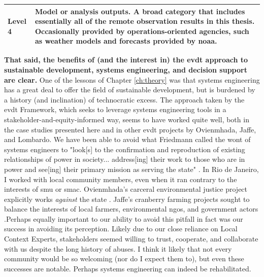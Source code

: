 \begin{table}[!htb]
\begin{center}
\begin{tabular}{ C{3cm}   L{8cm} }
Level 4 & Model or analysis outputs. A broad category that includes essentially all of the remote observation results in this thesis. Occasionally provided by operations-oriented agencies, such as weather models and forecasts provided by \ac{noaa}. \\ \hline

\end{tabular}
\end{center}
\end{table}

\textbf{That said, the benefits of (and the interest in) the \ac{evdt} approach to sustainable development, systems engineering, and decision support are clear.} One of the lessons of Chapter \ref{ch:theory} was that systems engineering has a great deal to offer the field of sustainable development, but is burdened by a history (and inclination) of technocratic excess. The approach taken by the \ac{evdt} Framework, which seeks to leverage systems engineering tools in a stakeholder-and-equity-informed way, seems to have worked quite well, both in the case studies presented here and in other \ac{evdt} projects by Ovienmhada, Jaffe, and Lombardo. We have been able to avoid what Friedmann called the wont of systems engineers to "look[s] to the confirmation and reproduction of existing relationships of power in society... address[ing] their work to those who are in power and see[ing] their primary mission as serving the state" \cite{friedmannPlanningPublicDomain1988}. In Rio de Janeiro, I worked with local community members, even when it ran contrary to the interests of \ac{smu} or \ac{smac}. Ovienmhada's carceral environmental justice project explicitly works \textit{against} the state \cite{ovienmhadaEnvironmentVulnerabilityDecisionTechnologyModelingFramework2021}. Jaffe's cranberry farming projects sought to balance the interests of local farmers, environmental \acp{ngo}, and government actors \cite{jaffeEnvironmentalEconomicSystems2022}.Perhaps equally important to our ability to avoid this pitfall in fact was our success in avoiding its perception. Likely due to our close reliance on Local Context Experts, stakeholders seemed willing to trust, cooperate, and collaborate with us despite the long history of abuses. I think it likely that not every community would be so welcoming (nor do I expect them to), but even these successes are notable. Perhaps systems engineering can indeed be rehabilitated.

